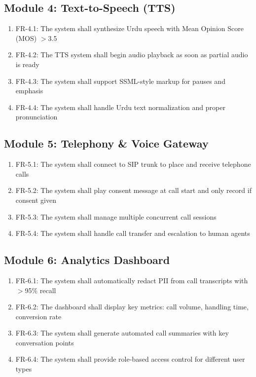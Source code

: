 \subsection{Module 4: Text-to-Speech (TTS)}
\begin{enumerate}
    \item FR-4.1: The system shall synthesize Urdu speech with Mean Opinion Score (MOS) $>$3.5
    \item FR-4.2: The TTS system shall begin audio playback as soon as partial audio is ready
    \item FR-4.3: The system shall support SSML-style markup for pauses and emphasis
    \item FR-4.4: The system shall handle Urdu text normalization and proper pronunciation
\end{enumerate}

\subsection{Module 5: Telephony \& Voice Gateway}
\begin{enumerate}
    \item FR-5.1: The system shall connect to SIP trunk to place and receive telephone calls
    \item FR-5.2: The system shall play consent message at call start and only record if consent given
    \item FR-5.3: The system shall manage multiple concurrent call sessions
    \item FR-5.4: The system shall handle call transfer and escalation to human agents
\end{enumerate}

\subsection{Module 6: Analytics Dashboard}
\begin{enumerate}
    \item FR-6.1: The system shall automatically redact PII from call transcripts with $>$95\% recall
    \item FR-6.2: The dashboard shall display key metrics: call volume, handling time, conversion rate
    \item FR-6.3: The system shall generate automated call summaries with key conversation points
    \item FR-6.4: The system shall provide role-based access control for different user types
\end{enumerate}

